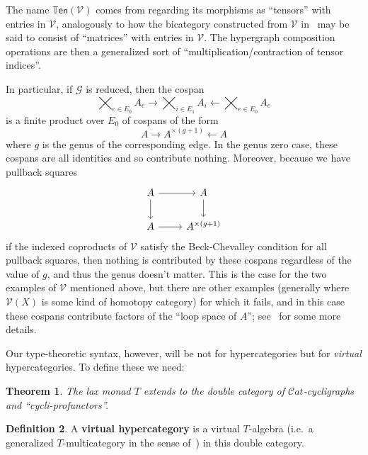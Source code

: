 \documentclass{article}
\newtheorem{thm}{Theorem}[section]
\theoremstyle{definition}
\newtheorem{defn}[thm]{Definition}
\theoremstyle{remark}
\def\G{\mathcal{G}}
\def\V{\mathscr{V}}
\def\ten{\mathbb{T}\mathsf{en}}
\def\Cat{\ensuremath{\mathcal{C}\mathit{at}}}
\let\ot\leftarrow
\begin{document}
The name $\ten(\V)$ comes from regarding its morphisms as ``tensors'' with entries in $\V$, analogously to how the bicategory constructed from $\V$ in~\cite{shulman:frbi,ps:indexed} may be said to consist of ``matrices'' with entries in $\V$.
The hypergraph composition operations are then a generalized sort of ``multiplication/contraction of tensor indices''.

In particular, if $\G$ is reduced, then the cospan
\[ \bigtimes_{e\in E_0} A_e \to \bigtimes_{i\in E_1} A_{i} \ot \bigtimes_{e\in E_0} A_e \]
is a finite product over $E_0$ of cospans of the form
\[ A \to A^{\times (g+1)} \ot A \]
where $g$ is the genus of the corresponding edge.
In the genus zero case, these cospans are all identities and so contribute nothing.
Moreover, because we have pullback squares
\[
\begin{tikzcd}
  A \ar[r] \ar[d] & A \ar[d] \\ A \ar[r] & A^{\times (g+1)}
\end{tikzcd}
\]
if the indexed coproducts of $\V$ satisfy the Beck-Chevalley condition for all pullback squares, then nothing is contributed by these cospans regardless of the value of $g$, and thus the genus doesn't matter.
This is the case for the two examples of $\V$ mentioned above, but there are other examples (generally where $\V(X)$ is some kind of homotopy category) for which it fails, and in this case these cospans contribute factors of the ``loop space of $A$''; see~\cite{ps:indexed} for some more details.

Our type-theoretic syntax, however, will be not for hypercategories but for \emph{virtual} hypercategories.
To define these we need:

\begin{thm}
  The lax monad $T$ extends to the double category of $\Cat$-cycligraphs and ``cycli-profunctors''.
\end{thm}

\begin{defn}
  A \textbf{virtual hypercategory} is a virtual $T$-algebra (i.e.\ a generalized $T$-multicategory in the sense of~\cite{cs:multicats}) in this double category.
\end{defn}
\end{document}

